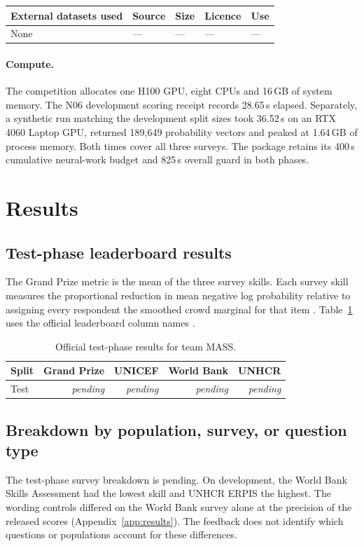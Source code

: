 \documentclass{article}
\newcommand{\teamid}{MASS}
\newcommand{\pending}{\textit{pending}}
\newcommand{\TestGrand}{\pending}
\newcommand{\TestUNICEF}{\pending}
\newcommand{\TestWB}{\pending}
\newcommand{\TestUNHCR}{\pending}
\newcommand{\TestBreakdown}{The test-phase survey breakdown is pending.}
\begin{document}
\begin{center}\small
\begin{tabularx}{\linewidth}{@{}Yllll@{}}\toprule
External datasets used & Source & Size & Licence & Use\\\midrule
None & --- & --- & --- & ---\\\bottomrule\end{tabularx}\end{center}

\paragraph{Compute.}
The competition allocates one H100 GPU, eight CPUs and 16\,GB of system memory. The N06 development scoring receipt records 28.65\,s elapsed. Separately, a synthetic run matching the development split sizes took 36.52\,s on an RTX 4060 Laptop GPU, returned 189,649 probability vectors and peaked at 1.64\,GB of process memory. Both times cover all three surveys. The package retains its 400\,s cumulative neural-work budget and 825\,s overall guard in both phases.

\section{Results}
\subsection{Test-phase leaderboard results}
The Grand Prize metric is the mean of the three survey skills. Each survey skill measures the proportional reduction in mean negative log probability relative to assigning every respondent the smoothed crowd marginal for that item \citep{grader}. Table~\ref{tab:test} uses the official leaderboard column names \citep{board}.
\begin{table}[ht]\centering
\caption{Official test-phase results for team \teamid.}\label{tab:test}
\begin{tabular}{@{}lrrrr@{}}\toprule
Split & Grand Prize & UNICEF & World Bank & UNHCR\\\midrule
Test & \TestGrand & \TestUNICEF & \TestWB & \TestUNHCR\\
\bottomrule\end{tabular}\end{table}

\subsection{Breakdown by population, survey, or question type}
\TestBreakdown{} On development, the World Bank Skills Assessment had the lowest skill and UNHCR ERPIS the highest. The wording controls differed on the World Bank survey alone at the precision of the released scores (Appendix~\ref{app:results}). The feedback does not identify which questions or populations account for these differences.
\end{document}
